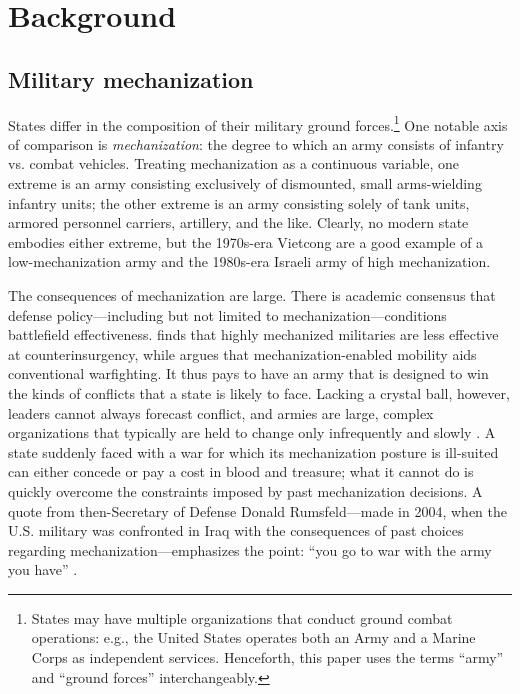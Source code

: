 \documentclass{article}
\begin{document}
\section{Background}

\subsection{Military mechanization}

States differ in the composition of their military ground forces.\footnote{States may have multiple organizations that
conduct ground combat operations: e.g., the United States operates both an Army
and a Marine Corps as independent services. Henceforth, this paper uses the
terms ``army'' and ``ground forces'' interchangeably.} One notable axis of comparison 
is \textit{mechanization}: the degree to which an army consists of infantry 
vs. combat vehicles. Treating mechanization as a continuous variable, 
one extreme is an army consisting exclusively of dismounted, small 
arms-wielding infantry units; the other extreme is an army consisting 
solely of tank units, armored personnel carriers, artillery, and the like.
Clearly, no modern state embodies either extreme, but the 1970s-era Vietcong are
a good example of a low-mechanization army and the 1980s-era Israeli army of
high mechanization.

The consequences of mechanization are large. There is
academic consensus that defense policy---including but not limited to
mechanization---conditions battlefield effectiveness. 
\citet{lyall2009rage} finds that highly mechanized militaries are less effective
at counterinsurgency, while \citet{biddle2004military} argues that
mechanization-enabled mobility aids conventional warfighting. It thus
pays to have an army that is designed to win the
kinds of
conflicts that a state is likely to face. Lacking a crystal ball, however,
leaders cannot always forecast conflict, and armies are large, complex
organizations that typically are held to change only infrequently and slowly
\citep{murray1998military,locher2004victory,zegart2000flawed}. A state suddenly faced with
a war for which its mechanization posture is ill-suited can either concede or
pay a cost in blood and treasure; what it cannot do is
quickly overcome the constraints imposed by past mechanization decisions. 
A quote from then-Secretary of Defense Donald Rumsfeld---made in 2004, when the U.S. military
was confronted in Iraq with the consequences of past choices regarding
mechanization---emphasizes the point:
``you go to war with the army you have'' \citep{schmitt_2004}. 
\end{document}
